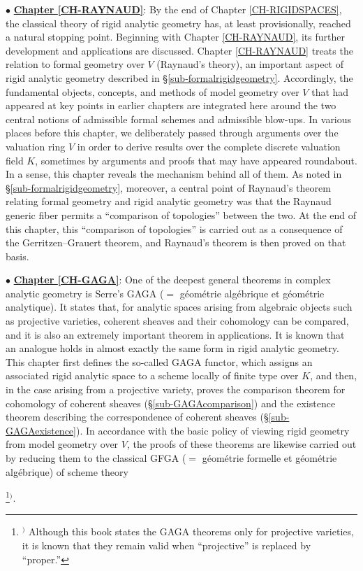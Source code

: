 \documentclass[a4paper,12pt, dvipdfmx]{jsbook}
\theoremstyle{plain}
\theoremstyle{definition}
\newcounter{chushaku}
\def\chu#1{\addtocounter{chushaku}{1}\footnote[\value{chushaku}]{${}^)$ #1}${}^)$}
\begin{document}
\medskip
$\bullet$ \underline{{\bf Chapter \ref{CH-RAYNAUD}}}: By the end of Chapter \ref{CH-RIGIDSPACES}, the classical theory of rigid analytic geometry has, at least provisionally, reached a natural stopping point. Beginning with Chapter \ref{CH-RAYNAUD}, its further development and applications are discussed.
Chapter \ref{CH-RAYNAUD} treats the relation to formal geometry over $V$ (Raynaud's theory), an important aspect of rigid analytic geometry described in \S\ref{sub-formalrigidgeometry}.
Accordingly, the fundamental objects, concepts, and methods of model geometry over $V$ that had appeared at key points in earlier chapters are integrated here around the two central notions of admissible formal schemes and admissible blow-ups.
In various places before this chapter, we deliberately passed through arguments over the valuation ring $V$ in order to derive results over the complete discrete valuation field $K$, sometimes by arguments and proofs that may have appeared roundabout. In a sense, this chapter reveals the mechanism behind all of them.
As noted in \S\ref{sub-formalrigidgeometry}, moreover, a central point of Raynaud's theorem relating formal geometry and rigid analytic geometry was that the Raynaud generic fiber permits a ``comparison of topologies'' between the two.
At the end of this chapter, this ``comparison of topologies'' is carried out as a consequence of the Gerritzen--Grauert theorem, and Raynaud's theorem is then proved on that basis.

\medskip
$\bullet$ \underline{{\bf Chapter \ref{CH-GAGA}}}: One of the deepest general theorems in complex analytic geometry is Serre's GAGA ($=$ g\'eom\'etrie alg\'ebrique et g\'eom\'etrie analytique).
It states that, for analytic spaces arising from algebraic objects such as projective varieties, coherent sheaves and their cohomology can be compared, and it is also an extremely important theorem in applications.
It is known that an analogue holds in almost exactly the same form in rigid analytic geometry.
This chapter first defines the so-called GAGA functor, which assigns an associated rigid analytic space to a scheme locally of finite type over $K$, and then, in the case arising from a projective variety, proves the comparison theorem for cohomology of coherent sheaves (\S\ref{sub-GAGAcomparison}) and the existence theorem describing the correspondence of coherent sheaves (\S\ref{sub-GAGAexistence}).
In accordance with the basic policy of viewing rigid geometry from model geometry over $V$, the proofs of these theorems are likewise carried out by reducing them to the classical GFGA ($=$ g\'eom\'etrie formelle et g\'eom\'etrie alg\'ebrique) of scheme theory\chu{Although this book states the GAGA theorems only for projective varieties, it is known that they remain valid when ``projective'' is replaced by ``proper.''}.
\end{document}
